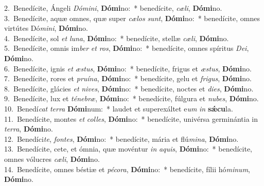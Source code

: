 {2.~}Benedícite, Ángeli \textit{Dó}\textit{mi}\textit{ni}, \textbf{Dó}\textbf{mi}no:~* benedícite, \textit{cæ}\textit{li}, \textbf{Dó}\textbf{mi}no.\\
{3.~}Benedícite, aquæ omnes, quæ super \textit{cæ}\textit{los} \textit{sunt}, \textbf{Dó}\textbf{mi}no:~* benedícite, omnes virtútes Dó\textit{mi}\textit{ni}, \textbf{Dó}\textbf{mi}no.\\
{4.~}Benedícite, sol \textit{et} \textit{lu}\textit{na}, \textbf{Dó}\textbf{mi}no:~* benedícite, stellæ \textit{cæ}\textit{li}, \textbf{Dó}\textbf{mi}no.\\
{5.~}Benedícite, omnis im\textit{ber} \textit{et} \textit{ros}, \textbf{Dó}\textbf{mi}no:~* benedícite, omnes spíritus \textit{De}\textit{i}, \textbf{Dó}\textbf{mi}no.\\
{6.~}Benedícite, ignis \textit{et} \textit{æ}\textit{stus}, \textbf{Dó}\textbf{mi}no:~* benedícite, frigus et \textit{æ}\textit{stus}, \textbf{Dó}\textbf{mi}no.\\
{7.~}Benedícite, rores et \textit{pru}\textit{í}\textit{na}, \textbf{Dó}\textbf{mi}no:~* benedícite, gelu et \textit{fri}\textit{gus}, \textbf{Dó}\textbf{mi}no.\\
{8.~}Benedícite, glácies \textit{et} \textit{ni}\textit{ves}, \textbf{Dó}\textbf{mi}no:~* benedícite, noctes et \textit{di}\textit{es}, \textbf{Dó}\textbf{mi}no.\\
{9.~}Benedícite, lux et \textit{té}\textit{ne}\textit{bræ}, \textbf{Dó}\textbf{mi}no:~* benedícite, fúlgura et \textit{nu}\textit{bes}, \textbf{Dó}\textbf{mi}no.\\
{10.~}Benedí\textit{cat} \textit{ter}\textit{ra} \textbf{Dó}\textbf{mi}num:~* laudet et superexáltet e\textit{um} \textit{in} \textbf{sǽ}\textbf{cu}la.\\
{11.~}Benedícite, montes \textit{et} \textit{col}\textit{les}, \textbf{Dó}\textbf{mi}no:~* benedícite, univérsa germinántia in \textit{ter}\textit{ra}, \textbf{Dó}\textbf{mi}no.\\
{12.~}Benedíci\textit{te}, \textit{fon}\textit{tes}, \textbf{Dó}\textbf{mi}no:~* benedícite, mária et flú\textit{mi}\textit{na}, \textbf{Dó}\textbf{mi}no.\\
{13.~}Benedícite, cete, et ómnia, quæ movéntur \textit{in} \textit{a}\textit{quis}, \textbf{Dó}\textbf{mi}no:~* benedícite, omnes vólucres \textit{cæ}\textit{li}, \textbf{Dó}\textbf{mi}no.\\
{14.~}Benedícite, omnes béstiæ et \textit{pé}\textit{co}\textit{ra}, \textbf{Dó}\textbf{mi}no:~* benedícite, fílii hó\textit{mi}\textit{num}, \textbf{Dó}\textbf{mi}no.\\
